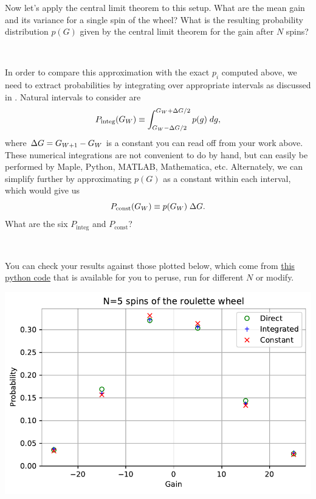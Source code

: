 \newpage %
Now let's apply the central limit theorem to this setup.
What are the mean gain and its variance for a single spin of the wheel?
What is the resulting probability distribution $p(G)$ given by the central limit theorem for the gain after $N$ spins?
\begin{mdframed}
  \ \\[100 pt]
\end{mdframed}
In order to compare this approximation with the exact $p_i$ computed above, we need to extract probabilities by integrating over appropriate intervals as discussed in .
Natural intervals to consider are
\begin{equation*}
  P_{\text{integ}}(G_W) \equiv \int_{G_W - \Delta G / 2}^{G_W + \Delta G / 2} p(g) \; dg,
\end{equation*}
where $\Delta G = G_{W + 1} - G_W$ is a constant you can read off from your work above.
These numerical integrations are not convenient to do by hand, but can easily be performed by Maple, Python, MATLAB, Mathematica, etc.
Alternately, we can simplify further by approximating $p(G)$ as a constant within each interval, which would give us
\begin{equation*}
  P_{\text{const}}(G_W) \equiv p(G_W) \; \Delta G.
\end{equation*}
What are the six $P_{\text{integ}}$ and $P_{\text{const}}$?
\begin{mdframed}
  \ \\[100 pt]
\end{mdframed}
You can check your results against those plotted below, which come from \href{https://github.com/daschaich/MATH327_2021/blob/master/lecture_notes/week01_prob.py}{this python code} that is available for you to peruse, run for different $N$ or modify.
\begin{center}
  \includegraphics[width=\textwidth]{figs/roulette_prob.pdf}
\end{center}



